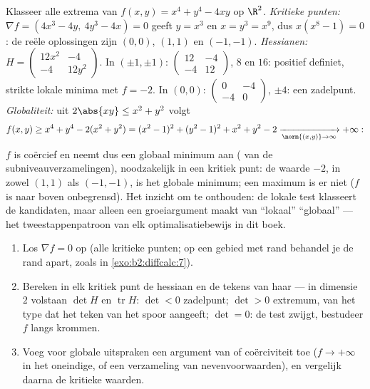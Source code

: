 \begin{example}\label{ex:b2:diffcalc:quarticrun}
Klasseer alle extrema van $f(x, y) = x^4 + y^4 - 4xy$ op $\R^2$.
\emph{Kritieke punten:} $\nabla f = (4x^3 - 4y,\ 4y^3 - 4x) = 0$
geeft $y = x^3$ en $x = y^3 = x^9$, dus $x(x^8 - 1) = 0$: de reële
oplossingen zijn $(0,0)$, $(1,1)$ en $(-1,-1)$. \emph{Hessianen:}
$H = \begin{pmatrix} 12x^2 & -4\\ -4 & 12y^2\end{pmatrix}$. In
$(\pm1, \pm1)$: $\begin{pmatrix} 12 & -4\\ -4 &
12\end{pmatrix}$,  $8$ en $16$: positief definiet,
strikte lokale minima met $f = -2$. In $(0,0)$: $\begin{pmatrix} 0
& -4\\ -4 & 0\end{pmatrix}$,  $\pm4$: een zadelpunt.
\emph{Globaliteit:} uit $2\abs{xy} \leq x^2 + y^2$ volgt
\[
f(x, y) \geq x^4 + y^4 - 2(x^2 + y^2)
= (x^2 - 1)^2 + (y^2 - 1)^2 + x^2 + y^2 - 2
\xrightarrow[\norm{(x,y)}\to\infty]{} +\infty :
\]
$f$ is coërcief en neemt dus een globaal minimum aan
( van de subniveauverzamelingen), noodzakelijk in een
kritiek punt: de waarde $-2$, in zowel $(1,1)$ als $(-1,-1)$, is
het globale minimum; een maximum is er niet ($f$ is naar boven
onbegrensd). Het inzicht om te onthouden: de lokale test klasseert
de kandidaten, maar alleen een groeiargument maakt van ``lokaal''
``globaal'' --- het tweestappenpatroon van elk optimalisatiebewijs
in dit boek.
\end{example}

\begin{method}\label{met:b2:diffcalc:extrema}
\begin{enumerate}
  \item Los $\nabla f = 0$ op (alle kritieke punten; op een gebied
        met rand behandel je de rand apart, zoals in
        \cref{exo:b2:diffcalc:7}).
  \item Bereken in elk kritiek punt de hessiaan en de tekens van
        haar  --- in dimensie $2$ volstaan $\det H$ en
        $\operatorname{tr} H$: $\det < 0$ zadelpunt; $\det > 0$
        extremum, van het type dat het teken van het spoor
        aangeeft; $\det = 0$: de test zwijgt, bestudeer $f$ langs
        krommen.
  \item Voeg voor globale uitspraken een argument van 
        of coërciviteit toe ($f \to +\infty$ in het oneindige, of
        een  verzameling van nevenvoorwaarden), en
        vergelijk daarna de kritieke waarden.
\end{enumerate}
\end{method}

